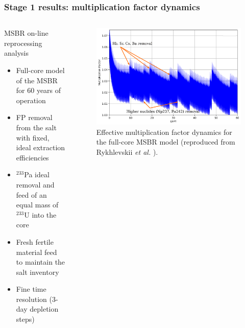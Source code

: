 \begin{frame}
\frametitle{Stage 1 results: multiplication factor dynamics}

\begin{columns}
	\column{4.3cm}
	\begin{block}{\gls{MSBR} on-line reprocessing analysis}
		\fontsize{7}{9}\selectfont
		\begin{itemize}
			\item Full-core model of the \gls{MSBR} for 60 years of operation
			\item FP removal from the salt with fixed, ideal extraction 
			efficiencies 
			\item $^{233}$Pa ideal removal and feed of an equal mass of 
			$^{233}$U into the core
			\item Fresh fertile material feed to maintain the salt inventory
			\item Fine time resolution (3-day depletion steps)
		\end{itemize}
	\end{block}    	
	
	\column{8cm}
		\begin{figure}[ht!] 
		\centering
			\includegraphics[width=\textwidth]{../figures/keff_msbr.png}
			\caption{Effective multiplication factor dynamics for the 
			full-core \gls{MSBR} model (reproduced from  
			Rykhlevskii \emph{et al.} \cite{rykhlevskii_modeling_2019}).}
		\end{figure}
	
\end{columns}
\end{frame}


